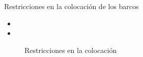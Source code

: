 \begin{frame}
    \begin{block}{Restricciones en la colocación de los barcos}
        \begin{itemize}
            \item{}
            \item{}
        \end{itemize}
    \end{block}


\begin{figure}
    \begin{columns}[c]
        
        \begin{column}{.3\textwidth}
            \centering
        \end{column}
        \begin{column}{.3\textwidth}
            \centering
            \caption{Restricciones en la colocación}
        \end{column}
    \end{columns}
\end{figure}

\end{frame}



